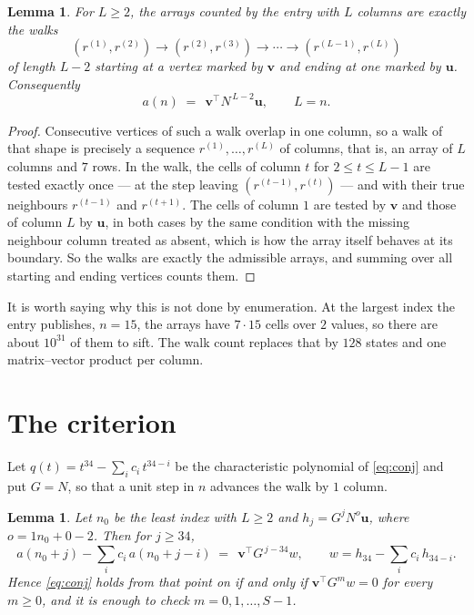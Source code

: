 \documentclass[11pt,a4paper]{article}
\theoremstyle{plain}
\newtheorem{lemma}[theorem]{Lemma}
\theoremstyle{definition}
\begin{document}
\begin{lemma}\label{lem:walk}
For $L\ge2$, the arrays counted by the entry with $L$ columns are exactly the walks
\[
(r^{(1)},r^{(2)})\to(r^{(2)},r^{(3)})\to\cdots\to(r^{(L-1)},r^{(L)})
\]
of length $L-2$ starting at a vertex marked by $\mathbf{v}$ and ending at one marked by
$\mathbf{u}$. Consequently
\[
a(n)\;=\;\,\mathbf{v}^{\!\top}N^{\,L-2}\mathbf{u},\qquad L=n .
\]
\end{lemma}

\begin{proof}
Consecutive vertices of such a walk overlap in one column, so a walk of that shape is
precisely a sequence $r^{(1)},\dots,r^{(L)}$ of columns, that is, an array of $L$ columns
and $7$ rows. In the walk, the cells of column $t$ for $2\le t\le L-1$ are tested
exactly once --- at the step leaving $(r^{(t-1)},r^{(t)})$ --- and with their true
neighbours $r^{(t-1)}$ and $r^{(t+1)}$. The cells of column $1$ are tested by
$\mathbf{v}$ and those of column $L$ by $\mathbf{u}$, in both cases by the same condition
with the missing neighbour column treated as absent, which is how the array itself behaves at
its boundary. So the walks are exactly the admissible arrays, and summing over all starting
and ending vertices counts them.
\end{proof}


It is worth saying why this is not done by enumeration. At the largest index the entry
publishes, $n=15$, the arrays have $7\cdot15$ cells over
$2$ values, so there are about $10^{31}$ of them to sift. The
walk count replaces that by $128$ states and one matrix--vector product per column.
\section{The criterion}

Let $q(t)=t^{34}-\sum_i c_i\,t^{34-i}$ be the characteristic polynomial of
\eqref{eq:conj} and put $G=N$, so that a unit step in $n$ advances the walk by
$1$ column.

\begin{lemma}\label{lem:crit}
Let $n_0$ be the least index with $L\ge2$ and $h_j=G^{j}N^{o}\mathbf{u}$, where
$o=1n_0+0-2$. Then for $j\ge34$,
\[
a(n_0+j)-\sum_i c_i\,a(n_0+j-i)\;=\;\,\mathbf{v}^{\!\top}G^{\,j-34}w,
\qquad w=h_{34}-\sum_i c_i\,h_{34-i} .
\]
Hence \eqref{eq:conj} holds from that point on if and only if
$\mathbf{v}^{\!\top}G^{m}w=0$ for every $m\ge0$, and it is enough to check
$m=0,1,\dots,S-1$.
\end{lemma}
\end{document}
